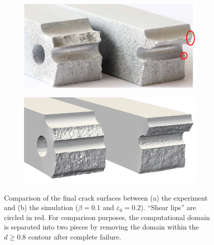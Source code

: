 \begin{figure}[!htb]
  \centering
  \begin{subfigure}[b]{0.4\textwidth}
    \centering
    \includegraphics[width=\textwidth,scale=0.5]{Chapter5/figures/3pb/split_experiment}
    \caption{}
  \end{subfigure}
  \begin{subfigure}[b]{0.4\textwidth}
    \centering
    \includegraphics[width=\textwidth,scale=0.5]{Chapter5/figures/3pb/split}
    \caption{}
  \end{subfigure}
  \caption{Comparison of the final crack surfaces between (a) the experiment \cite{kubik2019ductile} and (b) the simulation ($\beta = 0.1$ and $\varepsilon_0 = 0.2$). ``Shear lips'' are circled in red. For comparison purposes, the computational domain is separated into two pieces by removing the domain within the $d \ge 0.8$ contour after complete failure.}
  \label{fig: Chapter5/3pb/split_comparison}
\end{figure}
